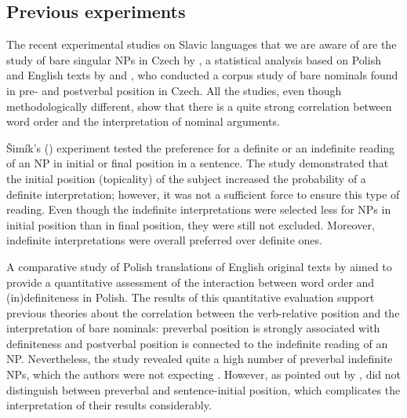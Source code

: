 \documentclass[output=paper]{langsci/langscibook}
\begin{document}
\subsection{Previous experiments}\label{2sec:31}
\largerpage[1]
The recent experimental studies on Slavic languages that we are aware of are the study of bare singular NPs in Czech by \cite{simik:14}, a statistical analysis based on Polish and English texts by \cite{czardybon:hellwig:petersen:14} and \cite{simik:burianova:18}, who conducted a corpus study of bare nominals found in pre- and postverbal position in Czech. All the studies, even though methodologically different, show that there is a quite strong correlation between word order and the interpretation of nominal arguments.

\v{S}im\'ik's (\citeyear{simik:14}) experiment tested the preference for a definite or an indefinite reading of an NP in initial or final position in a sentence. The study demonstrated that the initial position (topicality) of the subject increased the probability of a definite interpretation; however, it was not a sufficient force to ensure this type of reading. Even though the indefinite interpretations were selected less for NPs in initial position than in final position, they were still not excluded. Moreover, indefinite interpretations were overall preferred over definite ones.

{
A comparative study of Polish translations of English original texts by \cite{czardybon:hellwig:petersen:14} aimed to provide a quantitative assessment of the interaction between word order and (in)definiteness in Polish. The results of this quantitative evaluation support previous theories about the correlation between the verb-relative position and the interpretation of bare nominals: preverbal position is strongly associated with definiteness and postverbal position is connected to the indefinite reading of an NP. Nevertheless, the study revealed quite a high number of preverbal indefinite NPs, which the authors were not expecting \citep[][147-148]{czardybon:hellwig:petersen:14}. However, as pointed out by \cite{simik:burianova:18}, \cite{czardybon:hellwig:petersen:14} did not distinguish between preverbal and sentence-initial position, which complicates the interpretation of their results considerably.
}
\end{document}
